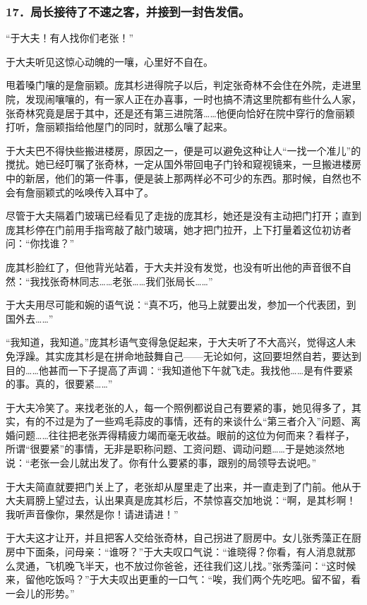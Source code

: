 \subsubsection*{17．局长接待了不速之客，并接到一封告发信。}
\par “于大夫！有人找你们老张！”
\par 于大夫听见这惊心动魄的一嚷，心里好不自在。
\par 甩着嗓门嚷的是詹丽颖。庞其杉进得院子以后，判定张奇林不会住在外院，走进里院，发现闹嚷嚷的，有一家人正在办喜事，一时也搞不清这里院都有些什么人家，张奇林究竟是居于其中，还是还有第三进院落……他便向恰好在院中穿行的詹丽颖打听，詹丽颖指给他屋门的同时，就那么嚷了起来。
\par 于大夫巴不得快些搬进楼房，原因之一，便是可以避免这种让人“一找一个准儿”的搅扰。她已经叮嘱了张奇林，一定从国外带回电子门铃和窥视镜来，一旦搬进楼房中的新居，他们的第一件事，便是装上那两样必不可少的东西。那时候，自然也不会有詹丽颖式的吆唤传入耳中了。
\par 尽管于大夫隔着门玻璃已经看见了走拢的庞其杉，她还是没有主动把门打开；直到庞其杉停在门前用手指弯敲了敲门玻璃，她才把门拉开，上下打量着这位初访者问：“你找谁？”
\par 庞其杉脸红了，但他背光站着，于大夫并没有发觉，也没有听出他的声音很不自然：“我找张奇林同志……老张……我们张局长……”
\par 于大夫用尽可能和婉的语气说：“真不巧，他马上就要出发，参加一个代表团，到国外去……”
\par “我知道，我知道。”庞其杉语气变得急促起来，于大夫听了不大高兴，觉得这人未免浮躁。其实庞其杉是在拼命地鼓舞自己——无论如何，这回要坦然自若，要达到目的……他甚而一下子提高了声调：“我知道他下午就飞走。我找他……是有件要紧的事。真的，很要紧……”
\par 于大夫冷笑了。来找老张的人，每一个照例都说自己有要紧的事，她见得多了，其实，有的不过是为了一些鸡毛蒜皮的事情，还有的来谈什么“第三者介入”问题、离婚问题……往往把老张弄得精疲力竭而毫无收益。眼前的这位为何而来？看样子，所谓“很要紧”的事情，无非是职称问题、工资问题、调动问题……于是她淡然地说：“老张一会儿就出发了。你有什么要紧的事，跟别的局领导去说吧。”
\par 于大夫简直就要把门关上了，老张却从屋里走了出来，并一直走到了门前。他从于大夫肩膀上望过去，认出果真是庞其杉后，不禁惊喜交加地说：“啊，是其杉啊！我听声音像你，果然是你！请进请进！”
\par 于大夫这才让开，并且把客人交给张奇林，自己拐进了厨房中。女儿张秀藻正在厨房中下面条，问母亲：“谁呀？”于大夫叹口气说：“谁晓得？你看，有人消息就那么灵通，飞机晚飞半天，也不放过你爸爸，还往我们这儿找。”张秀藻问：“这时候来，留他吃饭吗？”于大夫叹出更重的一口气：“唉，我们两个先吃吧。留不留，看一会儿的形势。”
